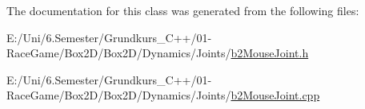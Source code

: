 The documentation for this class was generated from the following files\+:\begin{DoxyCompactItemize}
\item 
E\+:/\+Uni/6.\+Semester/\+Grundkurs\+\_\+\+C++/01-\/\+Race\+Game/\+Box2\+D/\+Box2\+D/\+Dynamics/\+Joints/\mbox{\hyperlink{b2_mouse_joint_8h}{b2\+Mouse\+Joint.\+h}}\item 
E\+:/\+Uni/6.\+Semester/\+Grundkurs\+\_\+\+C++/01-\/\+Race\+Game/\+Box2\+D/\+Box2\+D/\+Dynamics/\+Joints/\mbox{\hyperlink{b2_mouse_joint_8cpp}{b2\+Mouse\+Joint.\+cpp}}\end{DoxyCompactItemize}
